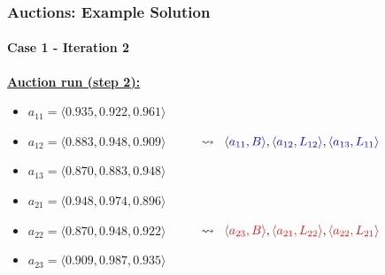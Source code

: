\begin{frame}
	\frametitle{Auctions: Example Solution}
	\framesubtitle{Case 1 - Iteration 2}
	
	\vspace{0.3cm}
	
	\textbf{\underline{Auction run (step 2):}}
	
	\begin{itemize}
		\item<1-> $ a_{11} = \langle 0.935,0.922,0.961 \rangle $
		\item<1-> $ a_{12} = \langle 0.883,0.948,0.909 \rangle $ $ \;\;\;\;\;\;\;\;\; \leadsto
					\;\; \textcolor{blue}{\langle a_{11},B \rangle}, \textcolor{blue}{\langle
					a_{12},L_{12} \rangle}, \textcolor{blue}{\langle a_{13},L_{11} \rangle} $
		\item<1-> $ a_{13} = \langle 0.870,0.883,0.948 \rangle $
		\vspace{0.5cm}
		\item<2-> $ a_{21} = \langle 0.948,0.974,0.896 \rangle $
		\item<2-> $ a_{22} = \langle 0.870,0.948,0.922 \rangle $ $ \;\;\;\;\;\;\;\;\; \leadsto
					\;\; \textcolor{red}{\langle a_{23},B \rangle}, \textcolor{red}{\langle
					a_{21},L_{22} \rangle}, \textcolor{red}{\langle a_{22},L_{21} \rangle} $
		\item<2-> $ a_{23} = \langle 0.909,0.987,0.935 \rangle $
	\end{itemize}
\end{frame}

